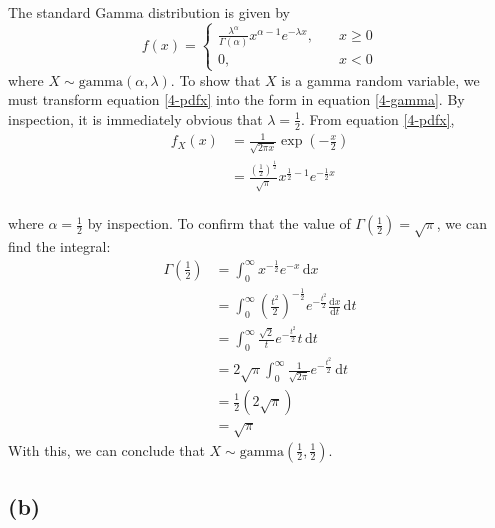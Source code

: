 \documentclass[12pt]{article}
\begin{document}
\noindent The standard Gamma distribution is given by \begin{equation}\label{4-gamma}
    f(x) = \begin{cases}
        \displaystyle \frac{\lambda^{\alpha}}{\Gamma(\alpha)}x^{\alpha-1}e^{-\lambda x}, \quad & x \geq 0 \\ 
        0, \quad & x < 0
    \end{cases}
\end{equation} where $X \sim \text{gamma}(\alpha, \lambda)$. To show that $X$ is a gamma random variable, we must transform equation \ref{4-pdfx} into the form in equation \ref{4-gamma}. By inspection, it is immediately obvious that $\lambda = \frac{1}{2}$. From equation \ref{4-pdfx}, \begin{align*}
    f_X (x) &= \frac{1}{\sqrt{2\pi x}}\exp (-\frac{x}{2}) \\ 
    &= \frac{\left( \frac{1}{2} \right)^{\frac{1}{2}}}{\sqrt{\pi}} x^{\frac{1}{2}-1} e^{-\frac{1}{2}x} \\ 
\end{align*} 

\noindent where $\alpha = \frac{1}{2}$ by inspection. To confirm that the value of $\Gamma(\frac{1}{2}) = \sqrt{\pi}$, we can find the integral: \begin{align*}
    \Gamma\left(\frac{1}{2}\right) &= \int_{0}^{\infty} x^{-\frac{1}{2}}e^{-x} \, \mathrm{d}x \\ 
    &= \int_{0}^{\infty} \left( \frac{t^{2}}{2} \right)^{-\frac{1}{2}}e^{-\frac{t^{2}}{2}} \frac{\mathrm{d}x}{\mathrm{d}t} \, \mathrm{d}t \\ 
    &= \int_{0}^{\infty} \frac{\sqrt{2}}{t}e^{-\frac{t^{2}}{2}} t\, \mathrm{d}t \\ 
    &= 2\sqrt{\pi} \int_{0}^{\infty} \frac{1}{\sqrt{2\pi}}e^{-\frac{t^{2}}{2}} \, \mathrm{d}t \\ 
    &= \frac{1}{2}(2\sqrt{\pi}) \\ 
    &= \sqrt{\pi}
\end{align*} With this, we can conclude that $\boxed{X \sim \text{gamma}\left(\frac{1}{2}, \frac{1}{2}\right)}$. 

\subsection*{(b)}
\end{document}
